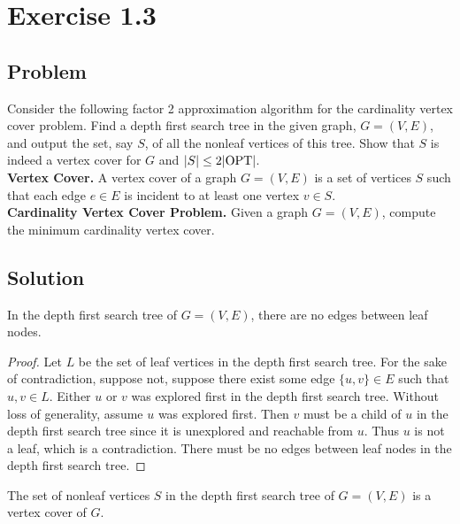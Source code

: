 \documentclass{article}
\begin{document}
\section*{Exercise 1.3}

\subsection*{Problem}

Consider the following factor 2 approximation algorithm for the cardinality vertex cover
problem. Find a depth first search tree in the given graph, $G = (V, E)$, and output the 
set, say $S$, of all the nonleaf vertices of this tree. Show that $S$ is indeed a vertex
cover for $G$ and $|S| \leq 2 |\mathrm{OPT}|$. \\

\textbf{Vertex Cover.} A vertex cover of a graph $G = (V, E)$ is a set of vertices $S$
such that each edge $e \in E$ is incident to at least one vertex $v \in S$. \\

\textbf{Cardinality Vertex Cover Problem.} Given a graph $G = (V, E)$, compute the 
minimum cardinality vertex cover.

\subsection*{Solution}

\begin{lemma*}
    In the depth first search tree of $G = (V, E)$, there are no edges between leaf 
    nodes.
\end{lemma*}

\begin{proof}
    Let $L$ be the set of leaf vertices in the depth first search tree. For the sake of
    contradiction, suppose not, suppose there exist some edge $\{u, v\} \in E$ such that
    $u, v \in L$. Either $u$ or $v$ was explored first in the depth first search tree.
    Without loss of generality, assume $u$ was explored first. Then $v$ must be a child
    of $u$ in the depth first search tree since it is unexplored and reachable from $u$. 
    Thus $u$ is not a leaf, which is a contradiction. There must be no edges between 
    leaf nodes in the depth first search tree.
\end{proof}

\begin{lemma*}
    The set of nonleaf vertices $S$ in the depth first search tree of $G = (V, E)$ is a 
    vertex cover of $G$.
\end{lemma*}
\end{document}
